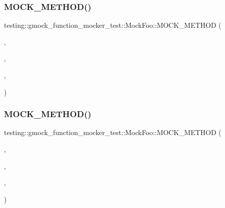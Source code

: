 \mbox{\label{classtesting_1_1gmock__function__mocker__test_1_1_mock_foo_a83b1f88fdda3669b8c600daee345bbbc}} 
\subsubsection{\texorpdfstring{MOCK\_METHOD()}{MOCK\_METHOD()}\hspace{0.1cm}{\footnotesize\ttfamily [32/38]}}
{\footnotesize\ttfamily testing\+::gmock\+\_\+function\+\_\+mocker\+\_\+test\+::\+Mock\+Foo\+::\+M\+O\+C\+K\+\_\+\+M\+E\+T\+H\+OD (\begin{DoxyParamCaption}\item[{char}]{,  }\item[{\mbox{\hyperlink{classtesting_1_1gmock__function__mocker__test_1_1_foo_interface_a94e43dbddc176d1702a7a7d7281f2642}{Overloaded\+On\+Constness}}}]{,  }\item[{()}]{,  }\item[{(override, const)}]{ }\end{DoxyParamCaption})}

\mbox{\label{classtesting_1_1gmock__function__mocker__test_1_1_mock_foo_a0a0a46aa356c5f7314a37fc1a4d16720}} 
\subsubsection{\texorpdfstring{MOCK\_METHOD()}{MOCK\_METHOD()}\hspace{0.1cm}{\footnotesize\ttfamily [33/38]}}
{\footnotesize\ttfamily testing\+::gmock\+\_\+function\+\_\+mocker\+\_\+test\+::\+Mock\+Foo\+::\+M\+O\+C\+K\+\_\+\+M\+E\+T\+H\+OD (\begin{DoxyParamCaption}\item[{int}]{,  }\item[{\mbox{\hyperlink{classtesting_1_1gmock__function__mocker__test_1_1_foo_interface_aa14850645cd7a5462480f1717df5153c}{Type\+With\+Hole}}}]{,  }\item[{(int($\ast$)())}]{,  }\item[{()}]{ }\end{DoxyParamCaption})}

